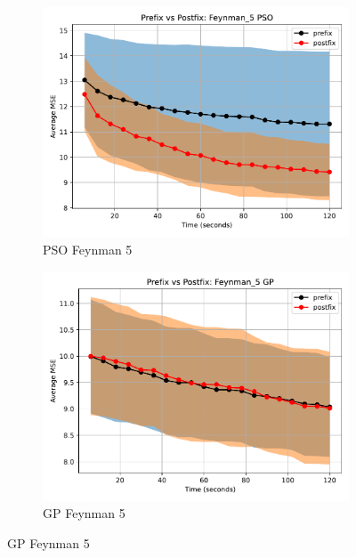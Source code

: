 \documentclass[12pt]{iopart}
\begin{document}
\begin{figure}
    \vspace{0.5cm}
    
    \begin{subfigure}[b]{0.4\textwidth}
        \includegraphics[width=\linewidth, keepaspectratio]{AIFeynman_Benchmarks/PrePostFeynman_5PSO.pdf}
        \caption{PSO Feynman 5}
        \label{subfig:feynman_5_PSO}
    \end{subfigure}
    \begin{subfigure}[b]{0.4\textwidth}
        \includegraphics[width=\linewidth, keepaspectratio]{AIFeynman_Benchmarks/PrePostFeynman_5GP.pdf}
        \caption{GP Feynman 5}
        \label{subfig:feynman_5_GP}
    \end{subfigure}
    

\end{figure}
\end{document}
